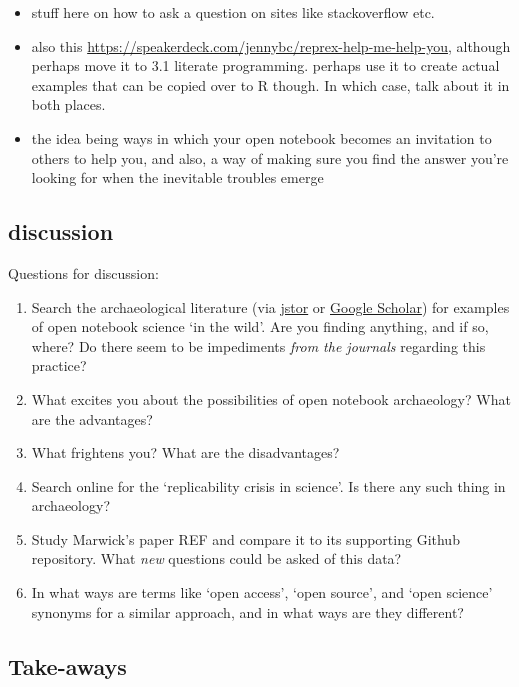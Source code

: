 \documentclass[english,]{book}
\providecommand{\tightlist}{%
  \setlength{\itemsep}{0pt}\setlength{\parskip}{0pt}}
\begin{document}
\begin{itemize}
\tightlist
\item
  stuff here on how to ask a question on sites like stackoverflow etc.
\item
  also this
  \url{https://speakerdeck.com/jennybc/reprex-help-me-help-you},
  although perhaps move it to 3.1 literate programming. perhaps use it
  to create actual examples that can be copied over to R though. In
  which case, talk about it in both places.
\item
  the idea being ways in which your open notebook becomes an invitation
  to others to help you, and also, a way of making sure you find the
  answer you're looking for when the inevitable troubles emerge
\end{itemize}

\subsection{discussion}\label{discussion}

Questions for discussion:

\begin{enumerate}
\def\labelenumi{\arabic{enumi}.}
\tightlist
\item
  Search the archaeological literature (via
  \href{http://jstor.org}{jstor} or
  \href{https://scholar.google.ca/}{Google Scholar}) for examples of
  open notebook science `in the wild'. Are you finding anything, and if
  so, where? Do there seem to be impediments \emph{from the journals}
  regarding this practice?
\item
  What excites you about the possibilities of open notebook archaeology?
  What are the advantages?
\item
  What frightens you? What are the disadvantages?
\item
  Search online for the `replicability crisis in science'. Is there any
  such thing in archaeology?
\item
  Study Marwick's paper REF and compare it to its supporting Github
  repository. What \emph{new} questions could be asked of this data?
\item
  In what ways are terms like `open access', `open source', and `open
  science' synonyms for a similar approach, and in what ways are they
  different?
\end{enumerate}

\subsection{Take-aways}\label{take-aways-2}
\end{document}
